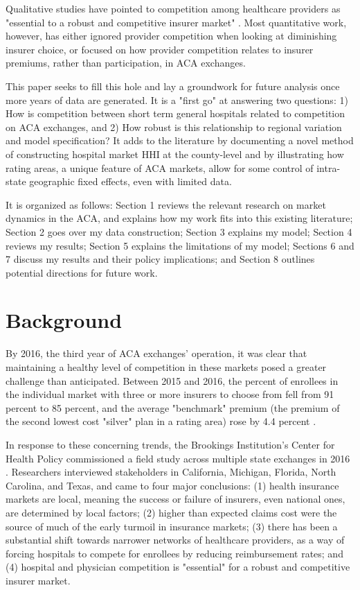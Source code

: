 \documentclass[12pt,letterpaper]{article}
\begin{document}
Qualitative studies have pointed to competition among healthcare providers as "essential to a robust and competitive insurer market" \citep{morrisey_five-state_2017}. Most quantitative work, however, has either ignored provider competition when looking at diminishing insurer choice,  or focused on how provider competition relates to insurer premiums, rather than participation, in ACA exchanges.

This paper seeks to fill this hole and lay a groundwork for future analysis once more years of data are generated. It is a "first go" at answering two questions: 1) How is competition between short term general hospitals related to competition on ACA exchanges, and 2) How robust is this relationship to regional variation and model specification? It adds to the literature by documenting a novel method of constructing hospital market HHI at the county-level and by illustrating how rating areas, a unique feature of ACA markets, allow for some control of intra-state geographic fixed effects, even with limited data. 

It is organized as follows: Section 1 reviews the relevant research on market dynamics in the ACA, and explains how my work fits into this existing literature; Section 2 goes over my data construction; Section 3 explains my model; Section 4 reviews my results; Section 5 explains the limitations of my model; Sections 6 and 7 discuss my results and their policy implications; and Section 8 outlines potential directions for future work. 

\section{Background}
By 2016, the third year of ACA exchanges' operation, it was clear that maintaining a healthy level of competition in these markets posed a greater challenge than anticipated.  Between 2015 and 2016, the percent of enrollees in the individual market with three or more insurers to choose from fell from 91 percent to 85 percent, and the average "benchmark" premium (the premium of the second lowest cost "silver" plan in a rating area) rose by 4.4 percent \citep{cox_analysis_2015}.

In response to these concerning trends, the Brookings Institution's Center for Health Policy commissioned a field study across multiple state exchanges in 2016 \citep{morrisey_five-state_2017}. Researchers interviewed stakeholders in California, Michigan, Florida, North Carolina, and Texas, and came to four major conclusions: (1) health insurance markets are local, meaning the success or failure of insurers, even national ones, are determined by local factors; (2) higher than expected claims cost were the source of much of the early turmoil in insurance markets; (3) there has been a substantial shift towards narrower networks of healthcare providers, as a way of forcing hospitals to compete for enrollees by reducing reimbursement rates; and (4) hospital and physician competition is "essential" for a robust and competitive insurer market. 
\end{document}
